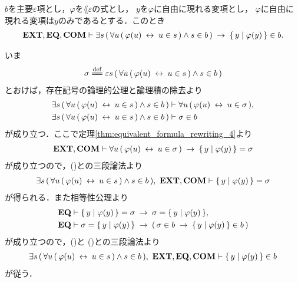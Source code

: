 	\begin{screen}
		\begin{thm}
		\label{thm:equivalent_formula_rewriting_10}
			$b$を主要$\varepsilon$項とし，$\varphi$を$\lang{\varepsilon}$の式とし，
			$y$を$\varphi$に自由に現れる変項とし，
			$\varphi$に自由に現れる変項は$y$のみであるとする．このとき
			\begin{align}
				\mbox{{\bf EXT}},\mbox{{\bf EQ}},\mbox{\bf COM} \vdash \exists s\, (\, \forall u\, (\, \varphi(u) \hspace{0.25em}\leftrightarrow\hspace{0.25em} u \in s\, ) \wedge s \in b\, ) \hspace{0.25em}\rightarrow\hspace{0.25em} \{\, y \mid \varphi(y)\, \} \in b.
			\end{align}
		\end{thm}
	\end{screen}
	
	\begin{sketch}
		いま
		\begin{align}
			\sigma \defeq \varepsilon s\, (\, \forall u\, (\, \varphi(u) \lrarrow u \in s\, ) \wedge s \in b\, )
		\end{align}
		とおけば，存在記号の論理的公理と論理積の除去より
		\begin{align}
			\exists s\, (\, \forall u\, (\, \varphi(u) \hspace{0.25em}\leftrightarrow\hspace{0.25em} u \in s\, ) \wedge s \in b\, )
			&\vdash \forall u\, (\, \varphi(u) \hspace{0.25em}\leftrightarrow\hspace{0.25em} u \in \sigma\, ), 
			\label{fom:equivalent_formula_rewriting_10_1} \\
			\exists s\, (\, \forall u\, (\, \varphi(u) \hspace{0.25em}\leftrightarrow\hspace{0.25em} u \in s\, ) \wedge s \in b\, )
			&\vdash \sigma \in b
			\label{fom:equivalent_formula_rewriting_10_2}
		\end{align}
		が成り立つ．ここで定理\ref{thm:equivalent_formula_rewriting_4}より
		\begin{align}
			\mbox{{\bf EXT}},\mbox{\bf COM} \vdash \forall u\, (\, \varphi(u) \hspace{0.25em}\leftrightarrow\hspace{0.25em} u \in \sigma\, )
			\hspace{0.25em}\rightarrow\hspace{0.25em} \{\, y \mid \varphi(y)\, \} = \sigma
		\end{align}
		が成り立つので，()との三段論法より
		\begin{align}
			\exists s\, (\, \forall u\, (\, \varphi(u) \hspace{0.25em}\leftrightarrow\hspace{0.25em} u \in s\, ) \wedge s \in b\, ),\ \mbox{{\bf EXT}},\mbox{\bf COM} \vdash \{\, y \mid \varphi(y)\, \} = \sigma
			\label{fom:equivalent_formula_rewriting_10_3}
		\end{align}
		が得られる．また相等性公理より
		\begin{align}
			\mbox{{\bf EQ}} &\vdash \{\, y \mid \varphi(y)\, \} = \sigma \hspace{0.25em}\rightarrow\hspace{0.25em} \sigma = \{\, y \mid \varphi(y)\, \}, \\
			\mbox{{\bf EQ}} &\vdash \sigma = \{\, y \mid \varphi(y)\, \} \hspace{0.25em}\rightarrow\hspace{0.25em}
			(\, \sigma \in b \hspace{0.25em}\rightarrow\hspace{0.25em} \{\, y \mid \varphi(y)\, \} \in b\, )
		\end{align}
		が成り立つので，()と
		()との三段論法より
		\begin{align}
			\exists s\, (\, \forall u\, (\, \varphi(u) \hspace{0.25em}\leftrightarrow\hspace{0.25em} u \in s\, ) \wedge s \in b\, ),\ \mbox{{\bf EXT}},\mbox{{\bf EQ}},\mbox{\bf COM} \vdash \{\, y \mid \varphi(y)\, \} \in b
		\end{align}
		が従う．
		\QED
	\end{sketch}
	
